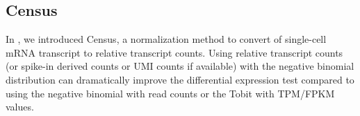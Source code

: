 \documentclass[10pt,oneside]{article}\usepackage[]{graphicx}\usepackage[]{color}
\begin{document}
% 
% 	
% 	
\subsection{Census}\label{Census}
In \cite{qiu2017single}, we introduced Census, a normalization method to convert of single-cell mRNA transcript to relative transcript counts. Using relative transcript counts (or spike-in derived counts or UMI counts if available) with the negative binomial distribution can dramatically improve the differential expression test compared to using the negative binomial with read counts or the Tobit with TPM/FPKM values. 
\end{document}

